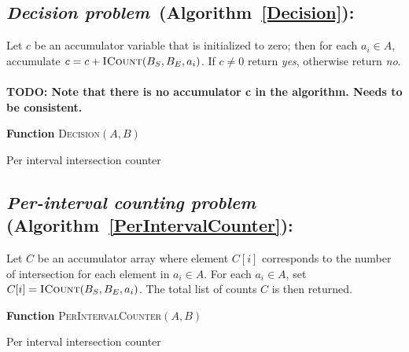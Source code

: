 \subsection {{\em Decision problem}~(Algorithm~\ref{Decision}):} Let $c$ be an accumulator variable that is
    initialized to zero; then for each $a_i \in A$, accumulate $c = c +
    \textsc{ICount}(B_S,B_E,a_i)$.  If $c\ne0$ return {\em yes}, otherwise
    return {\em no}.
\\
\\
\textbf{TODO: Note that there is no accumulator c in the algorithm.  Needs to
be consistent.}
\\
	 \begin{algorithm}[h!]
		\label{Decision}
	 	\DontPrintSemicolon
	 	\footnotesize
	 	\BlankLine
	 	\textbf{Function} \textsc{Decision}$(A,B)$
	 	\caption{Per interval intersection counter}
	 \end{algorithm}


\subsection {{\em Per-interval counting problem}
	(Algorithm~\ref{PerIntervalCounter}):}
	 Let $C$ be an accumulator array where element $C[i]$ corresponds to the
	 number of intersection for each element in $a_i\in A$.  For each 
	 $a_i \in A$, set $C[i]=\textsc{ICount}(B_S,B_E,a_i)$.  The total list of
	 counts $C$ is then returned.

	 \begin{algorithm}[h!]
	 	\DontPrintSemicolon
	 	\footnotesize
	 	\BlankLine
	 	\textbf{Function} \textsc{PerIntervalCounter}$(A,B)$
	 	\caption{Per interval intersection counter}
		\label{PerIntervalCounter}
	 \end{algorithm}


